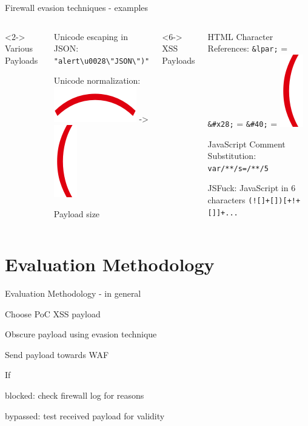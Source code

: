 \documentclass[aspectratio=169]{beamer}
\begin{document}
\begin{frame}[fragile]{Firewall evasion techniques - examples}
	\begin{columns}
		<2->
		Various Payloads
		\begin{vfilleditems}
			\item<3-> Unicode escaping in JSON: \verb|"alert\u0028\"JSON\")"|
			\item<4-> Unicode normalization: \  \includegraphics[width=.07\linewidth]{UFE35.png} -> \includegraphics[width=.02\linewidth]{U0028.png}
			\item<5-> Payload size
		\end{vfilleditems}
		<6->
		XSS Payloads
		\begin{vfilleditems}
			\item<7-> HTML Character References: \verb|&lpar;| {\color{red}=} \verb|&#x28;| {\color{red}=} \verb|&#40;| {\color{red}=} \includegraphics[width=.02\linewidth]{U0028.png}
			\item<8-> JavaScript Comment Substitution: \verb|var/**/s=/**/5|
			\item<9-> JSFuck: JavaScript in 6 characters \verb|(![]+[])[+!+[]]+...| \  \cite{mk/jsfuck}
		\end{vfilleditems}
	\end{columns}
\end{frame}

\section{Evaluation Methodology}
\begin{frame}[fragile]{Evaluation Methodology - in general}
	\begin{vfilleditems}
		\item<2-> Choose PoC XSS payload
		\item<3-> Obscure payload using evasion technique
		\item<4-> Send payload towards WAF
		\item<5-> If
		\begin{vfilleditems}
			\item<6-> blocked: check firewall log for reasons
			\item<7-> bypassed: test received payload for validity
		\end{vfilleditems}
	\end{vfilleditems}
\end{frame}
\end{document}
